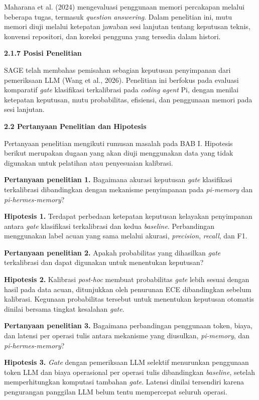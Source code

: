 \documentclass[12pt,a4paper]{article}
\newcommand{\asing}[1]{\textit{#1}}
\newcommand{\pim}{\textit{pi-memory}}
\newcommand{\phm}{\textit{pi-hermes-memory}}
\newcommand{\subbab}[2]{%
  \par\vspace{0.8em}\phantomsection\label{#2}%
  \noindent\textbf{#1}\par\nopagebreak\vspace{0.3em}}
\newcommand{\subsubbab}[2]{%
  \par\vspace{0.5em}\phantomsection\label{#2}%
  \noindent\textbf{#1}\par\nopagebreak\vspace{0.2em}}
\begin{document}
Maharana et al. (2024) mengevaluasi penggunaan memori percakapan melalui beberapa tugas, termasuk \asing{question answering}. Dalam penelitian ini, mutu memori diuji melalui ketepatan jawaban sesi lanjutan tentang keputusan teknis, konvensi repositori, dan koreksi pengguna yang tersedia dalam histori.

\subsubbab{2.1.7 Posisi Penelitian}{sec:2.1.7}

SAGE telah membahas pemisahan sebagian keputusan penyimpanan dari pemeriksaan LLM (Wang et al., 2026). Penelitian ini berfokus pada evaluasi komparatif \asing{gate} klasifikasi terkalibrasi pada \asing{coding agent} Pi, dengan menilai ketepatan keputusan, mutu probabilitas, efisiensi, dan penggunaan memori pada sesi lanjutan.

\subbab{2.2 Pertanyaan Penelitian dan Hipotesis}{sec:2.2}

Pertanyaan penelitian mengikuti rumusan masalah pada BAB I. Hipotesis berikut merupakan dugaan yang akan diuji menggunakan data yang tidak digunakan untuk pelatihan atau penyesuaian kalibrasi.

\textbf{Pertanyaan penelitian 1.} Bagaimana akurasi keputusan \asing{gate} klasifikasi terkalibrasi dibandingkan dengan mekanisme penyimpanan pada \pim{} dan \phm{}?

\textbf{Hipotesis 1.} Terdapat perbedaan ketepatan keputusan kelayakan penyimpanan antara \asing{gate} klasifikasi terkalibrasi dan kedua \asing{baseline}. Perbandingan menggunakan label acuan yang sama melalui akurasi, \asing{precision}, \asing{recall}, dan F1.

\textbf{Pertanyaan penelitian 2.} Apakah probabilitas yang dihasilkan \asing{gate} terkalibrasi dan dapat digunakan untuk menentukan keputusan?

\textbf{Hipotesis 2.} Kalibrasi \asing{post-hoc} membuat probabilitas \asing{gate} lebih sesuai dengan hasil pada data acuan, ditunjukkan oleh penurunan ECE dibandingkan sebelum kalibrasi. Kegunaan probabilitas tersebut untuk menentukan keputusan otomatis dinilai bersama tingkat kesalahan \asing{gate}.

\textbf{Pertanyaan penelitian 3.} Bagaimana perbandingan penggunaan token, biaya, dan latensi per operasi tulis antara mekanisme yang diusulkan, \pim{}, dan \phm{}?

\textbf{Hipotesis 3.} \asing{Gate} dengan pemeriksaan LLM selektif menurunkan penggunaan token LLM dan biaya operasional per operasi tulis dibandingkan \asing{baseline}, setelah memperhitungkan komputasi tambahan \asing{gate}. Latensi dinilai tersendiri karena pengurangan panggilan LLM belum tentu mempercepat seluruh operasi.
\end{document}
